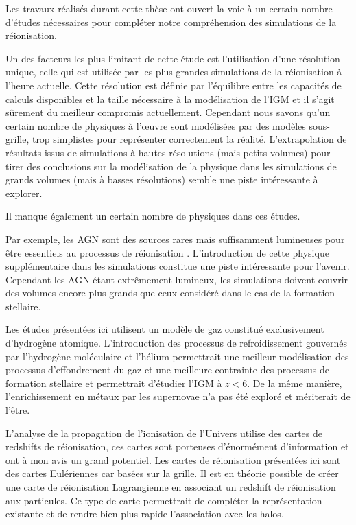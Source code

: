 Les travaux réalisés durant cette thèse ont ouvert la voie à un certain nombre d'études nécessaires pour compléter notre compréhension des simulations de la réionisation.

Un des facteurs les plus limitant de cette étude est l'utilisation d'une résolution unique, celle qui est utilisée par les plus grandes simulations de la réionisation à l'heure actuelle. 
Cette résolution est définie par l’équilibre entre les capacités de calculs disponibles et la taille nécessaire à la modélisation de l'\ac{IGM} et il s'agit sûrement du meilleur compromis actuellement.
Cependant nous savons qu'un certain nombre de physiques à l’œuvre sont modélisées par des modèles sous-grille, trop simplistes pour représenter correctement la réalité.
L'extrapolation de résultats issus de simulations à hautes résolutions (mais petits volumes) pour tirer des conclusions sur la modélisation de la physique dans les simulations de grands volumes (mais à basses résolutions) semble une piste intéressante à explorer.

Il manque également un certain nombre de physiques dans ces études.

Par exemple, les \ac{AGN} sont des sources rares mais suffisamment lumineuses pour être essentiels au processus de réionisation \citep{chardin_large-scale_2017}.
L'introduction de cette physique supplémentaire dans les simulations constitue une piste intéressante pour l'avenir.
Cependant les \ac{AGN} étant extrêmement lumineux, les simulations doivent couvrir des volumes encore plus grands que ceux considéré dans le cas de la formation stellaire.

Les études présentées ici utilisent un modèle de gaz constitué exclusivement d'hydrogène atomique.
L'introduction des processus de refroidissement gouvernés par l'hydrogène moléculaire et l'hélium permettrait une meilleur modélisation des processus d’effondrement du gaz et une meilleure contrainte des processus de formation stellaire et permettrait d'étudier l'\ac{IGM} à $z<6$.
De la même manière, l'enrichissement en métaux par les supernovae n'a pas été exploré et mériterait de l'être.

L'analyse de la propagation de l'ionisation de l'Univers utilise des cartes de redshifts de réionisation, ces cartes sont porteuses d'énormément d'information et ont à mon avis un grand potentiel.
Les cartes de réionisation présentées ici sont des cartes Eulériennes car basées sur la grille.
Il est en théorie possible de créer une carte de réionisation Lagrangienne en associant un redshift de réionisation aux particules.
Ce type de carte permettrait de compléter la représentation existante et de rendre bien plus rapide l'association avec les halos.

